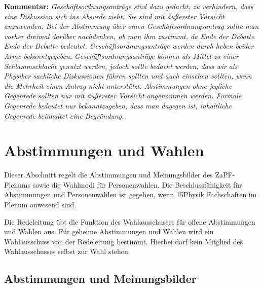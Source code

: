 \documentclass[draft,12pt,oneside]{scrreprt}
\begin{document}
\textbf{Kommentar:} \textit{\footnotesize Geschäftsordnungsanträge sind dazu
  gedacht, zu verhindern, dass eine Diskussion sich ins Absurde zieht.
  Sie sind mit äußerster Vorsicht anzuwenden.
  Bei der Abstimmung über einen Geschäftsordnungsantrag sollte man vorher dreimal
  darüber nachdenken, ob man ihm zustimmt, da Ende der Debatte Ende der Debatte
  bedeutet.
  Geschäftsordnungsanträge werden durch heben beider Arme bekanntgegeben.
  Geschäftsordnungsanträge können als Mittel zu einer Schlammschlacht genutzt
  werden, jedoch sollte bedacht werden, dass wir als Physiker sachliche
  Diskussionen führen sollten und auch einsehen sollten, wenn die Mehrheit einen
  Antrag nicht unterstützt.
  Abstimmungen ohne jegliche Gegenrede sollten nur mit äußerster Vorsicht
  angenommen werden.
  Formale Gegenrede bedeutet nur bekanntzugeben, dass man dagegen ist, inhaltliche
  Gegenrede beinhaltet eine Begründung.}

\section{Abstimmungen und Wahlen}

Dieser Abschnitt regelt die Abstimmungen und Meinungsbilder des ZaPF-Plenums
sowie die Wahlmodi für Personenwahlen. Die Beschlussfähigkeit für Abstimmungen
und Personenwahlen ist gegeben, wenn 15\footnotemark Physik Fachschaften
im Plenum anwesend sind.

Die Redeleitung übt die Funktion des Wahlausschusses für offene Abstimmungen und
Wahlen aus. Für geheime Abstimmungen und Wahlen wird ein Wahlausschuss von der
Redeleitung bestimmt. Hierbei darf kein Mitglied des Wahlausschusses selbst zur
Wahl stehen.



\subsection{Abstimmungen und Meinungsbilder}
\end{document}
